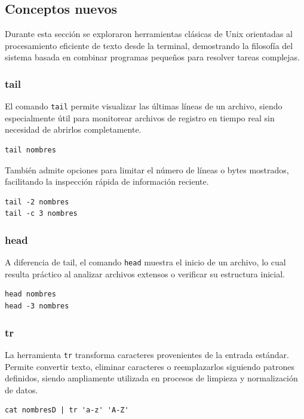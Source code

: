 \documentclass[11pt, letterpaper]{article}
\begin{document}
\subsection{Conceptos nuevos}
\label{sec:org8ce17e5}

Durante esta sección se exploraron herramientas clásicas de Unix
orientadas al procesamiento eficiente de texto desde la terminal,
demostrando la filosofía del sistema basada en combinar programas
pequeños para resolver tareas complejas.
\subsubsection{tail}
\label{sec:org28e6c24}

El comando \texttt{tail} permite visualizar las últimas líneas de un archivo,
siendo especialmente útil para monitorear archivos de registro en
tiempo real sin necesidad de abrirlos completamente.

\begin{verbatim}
tail nombres
\end{verbatim}

También admite opciones para limitar el número de líneas o bytes
mostrados, facilitando la inspección rápida de información reciente.

\begin{verbatim}
tail -2 nombres
tail -c 3 nombres
\end{verbatim}
\subsubsection{head}
\label{sec:orgfe3cdcf}

A diferencia de tail, el comando \texttt{head} muestra el inicio de un archivo,
lo cual resulta práctico al analizar archivos extensos o verificar su
estructura inicial.

\begin{verbatim}
head nombres
head -3 nombres
\end{verbatim}
\subsubsection{tr}
\label{sec:orgd2840ad}

La herramienta \texttt{tr} transforma caracteres provenientes de la entrada
estándar. Permite convertir texto, eliminar caracteres o reemplazarlos
siguiendo patrones definidos, siendo ampliamente utilizada en procesos
de limpieza y normalización de datos.

\begin{verbatim}
cat nombresD | tr 'a-z' 'A-Z'
\end{verbatim}
\end{document}
